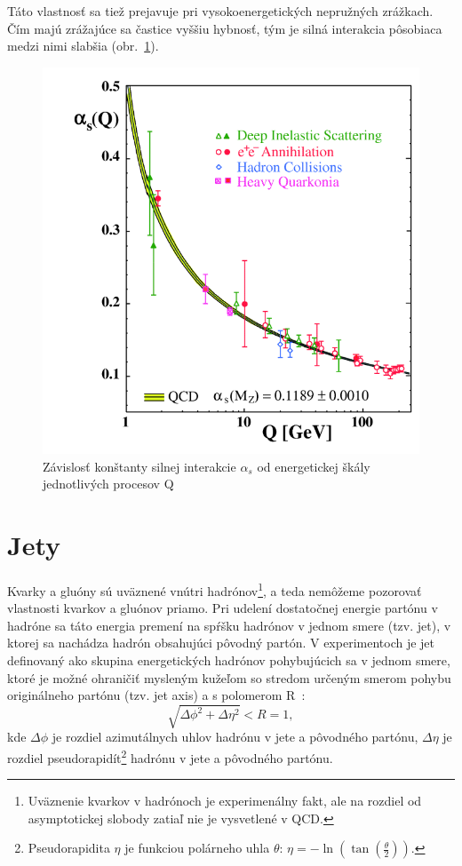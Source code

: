 \documentclass[thesismargins, thesislinespacing]{rnthesis}
\begin{document}
Táto vlastnosť sa tiež prejavuje pri vysokoenergetických nepružných zrážkach. Čím majú zrážajúce sa častice vyššiu hybnosť, tým je silná interakcia pôsobiaca medzi nimi slabšia (obr.~\ref{alfa}).
\begin{figure}
	\centering
	\includegraphics[scale=0.4]{./Obrazky_praca/zrazka.png}
	\caption{Závislosť konštanty silnej interakcie $\alpha_s$ od energetickej škály jednotlivých procesov Q \cite{3}}
	\label{alfa}
\end{figure}




\section{Jety}

Kvarky a gluóny sú uväznené vnútri hadrónov\footnote{Uväznenie kvarkov v hadrónoch je experimenálny fakt, ale na rozdiel od asymptotickej slobody zatiaľ nie je vysvetlené v QCD.}, a teda nemôžeme pozorovať vlastnosti kvarkov a gluónov priamo. Pri udelení dostatočnej energie partónu v hadróne sa táto energia premení na spŕšku hadrónov v jednom smere (tzv. jet), v ktorej sa nachádza hadrón obsahujúci pôvodný partón. V experimentoch je jet definovaný ako skupina energe\-tických hadrónov pohybujúcich sa v jednom smere, ktoré je možné ohraničiť mysleným kužeľom so stredom určeným smerom pohybu originálneho partónu (tzv. jet axis) a s polomerom R~\cite{4}:
\begin{equation}
\sqrt{\Delta \phi^2 + \Delta \eta^2}<R=1,
\end{equation}
kde $\Delta \phi$ je rozdiel azimutálnych uhlov hadrónu v jete a pôvodného partónu, $\Delta \eta$ je rozdiel pseudorapidít\footnote{Pseudorapidita $\eta$ je funkciou polárneho uhla $\theta$: $\eta = - \ln( \tan (\frac{\theta}{2}))$.} hadrónu v jete a pôvodného partónu.
\end{document}
